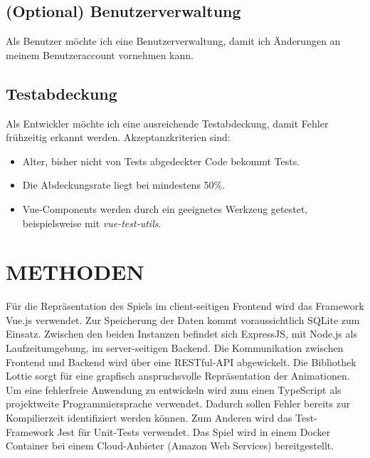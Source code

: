 \documentclass[letterpaper, 10 pt, conference]{ieeeconf}
\begin{document}
\subsection{(Optional) Benutzerverwaltung}

Als Benutzer möchte ich eine Benutzerverwaltung,  damit ich Änderungen an meinem Benutzeraccount vornehmen kann. 

\subsection{Testabdeckung}

Als Entwickler möchte ich eine ausreichende Testabdeckung,  damit Fehler frühzeitig erkannt werden.  Akzeptanzkriterien sind:
\begin{itemize}
\item Alter,  bisher nicht von Tests abgedeckter Code bekommt Tests.
\item Die Abdeckungsrate liegt bei mindestens 50\%.
\item Vue-Components werden durch ein geeignetes Werkzeug getestet, beispielsweise mit \textit{vue-test-utils}.
\end{itemize}

\section{METHODEN}
Für die Repräsentation des Spiels im client-seitigen Frontend wird das Framework Vue.js verwendet.  Zur Speicherung der Daten kommt voraussichtlich SQLite zum Einsatz. Zwischen den beiden Instanzen befindet sich ExpressJS, mit Node.js als Laufzeitumgebung, im server-seitigen Backend.  Die Kommunikation zwischen Frontend und Backend wird über eine RESTful-API abgewickelt.
Die Bibliothek Lottie sorgt für eine grapfisch anspruchsvolle Repräsentation der Animationen. 
Um eine fehlerfreie Anwendung zu entwickeln wird zum einen TypeScript als projektweite Programmiersprache verwendet.  Dadurch sollen Fehler bereits zur Kompilierzeit identifiziert werden können.  Zum Anderen wird das Test-Framework Jest für Unit-Tests verwendet. 
Das Spiel wird in einem Docker Container bei einem Cloud-Anbieter (Amazon Web Services) bereitgestellt.

\addtolength{\textheight}{-12cm} 
\end{document}

